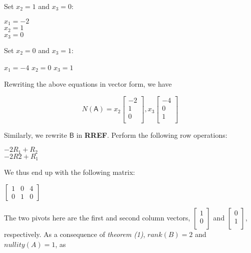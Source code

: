 \documentclass[a4paper, 11pt]{article}
\newcommand{\mat}[1]{\boldsymbol { \mathsf{#1}} }
\begin{document}
\begin{enumerate}
Set $x_2 = 1$ and $x_3 = 0$:

\begin{center}
    $x_1  = -2$ \\
    $x_2 = 1$ \\
    $x_3 = 0$ \\
\end{center}

Set $x_2 = 0$ and $x_3 = 1$:

\begin{center}
    $x_1 = -4$
    $x_2 = 0$
    $x_3 = 1$
\end{center}

Rewriting the above equations in vector form, we have

\begin{equation*}
    N(\mat{A}) = x_2 
    \begin{bmatrix}
    -2 \\
    1 \\
    0 \\
    \end{bmatrix},
    x_3
    \begin{bmatrix}
    -4 \\
    0 \\
    1 \\
    \end{bmatrix}
\end{equation*}

Similarly, we rewrite $\mat{B}$ in \textbf{RREF}. Perform the following row operations:

\begin{center}
	$-2R_1 + R_2$ \\
	$-2R2 + R_1$ \\
\end{center}

We thus end up with the following matrix:

	$\begin{bmatrix}
	1 & 0 & 4 \\
	0 & 1 & 0 
	\end{bmatrix}$


The two pivots here are the first and second column vectors, 
$\begin{bmatrix}
1 \\
0 \\
\end{bmatrix}$ and 
$\begin{bmatrix}
0 \\
1 \\
\end{bmatrix}$, 
respectively. As a consequence of \textit{theorem (1)}, $rank(B) = 2$ and $nullity(A) = 1$, as 


\end{enumerate}
\end{document}
